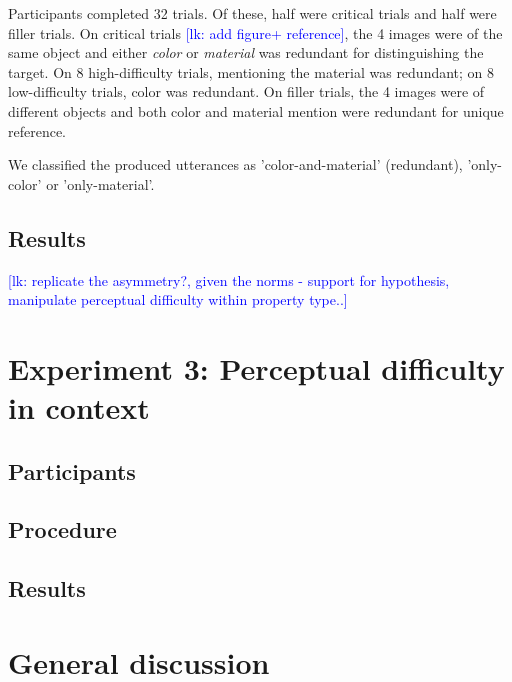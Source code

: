 \documentclass[12pt,letterpaper]{article}
\newcommand{\lk}[1]{\textcolor{Blue}{[lk: #1]}}
\begin{document}
Participants completed 32 trials. Of these, half were critical trials and half were filler trials. On critical trials \lk {add figure+ reference}, the 4 images were of the same object and either \textit{color} or \textit{material} was redundant for distinguishing the target. On 8 high-difficulty trials, mentioning the material was redundant; on 8 low-difficulty trials, color was redundant. On filler trials, the 4 images were of different objects and both color and material mention were redundant for unique reference. 

We classified the produced utterances as 'color-and-material' (redundant), 'only-color' or 'only-material'.

\subsection{Results}

\lk {replicate the asymmetry?, given the norms - support for hypothesis, manipulate perceptual difficulty within property type..}

\section{Experiment 3: Perceptual difficulty in context}
\subsection{Participants}
\subsection{Procedure}
\subsection{Results}
 
\section{General discussion} 
 
\end{document}
